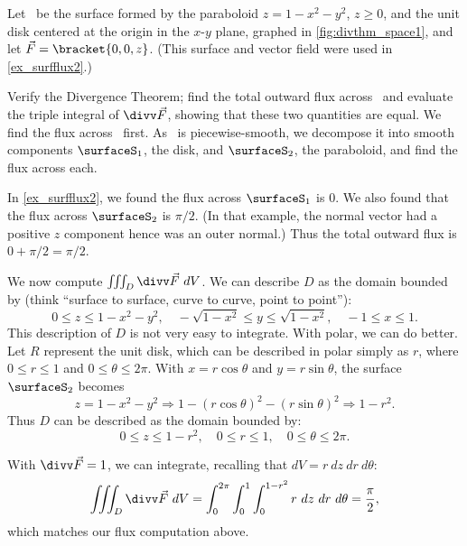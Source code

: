 \begin{example}\label{ex_divthm_space1}
Let \surfaceS\ be the surface formed by the paraboloid $z=1-x^2-y^2$, $z\geq 0$, and the unit disk centered at the origin in the $x$-$y$ plane, graphed in \autoref{fig:divthm_space1}, and let $\vec F =\bracket{0,0,z}$. (This surface and vector field were used in \autoref{ex_surfflux2}.)

Verify the Divergence Theorem; find the total outward flux across \surfaceS\ and evaluate the triple integral of $\divv \vec F$, showing that these two quantities are equal.
\solution
We find the flux across \surfaceS\ first. As \surfaceS\ is piecewise-smooth, we decompose it into smooth components $\surfaceS_1$, the disk, and $\surfaceS_2$, the paraboloid, and find the flux across each.

In \autoref{ex_surfflux2}, we found the flux across $\surfaceS_1$ is 0. We also found that the flux across $\surfaceS_2$ is $\pi/2$. (In that example, the normal vector had a positive $z$ component hence was an outer normal.) Thus the total outward flux is $0+\pi/2 = \pi/2$.

We now compute $\iiint_D \divv \vec F\ dV$. We can describe $D$ as the domain bounded by (think ``surface to surface, curve to curve, point to point''):
\[
0\leq z\leq 1-x^2-y^2,
\quad -\sqrt{1-x^2}\leq y\leq \sqrt{1-x^2},
\quad -1\leq x\leq 1.
\]
This description of $D$ is not very easy to integrate. With polar, we can do better. Let $R$ represent the unit disk, which can be described in polar simply as $r$, where $0\leq r\leq 1$ and $0\leq \theta\leq 2\pi$. With $x=r\cos \theta$ and $y=r\sin\theta$, the surface $\surfaceS_2$ becomes
\[z=1-x^2-y^2 \Rightarrow 1-(r\cos\theta)^2-(r\sin\theta)^2 \Rightarrow 1-r^2.\]
Thus $D$ can be described as the domain bounded by:
\[0\leq z\leq 1-r^2,\quad 0\leq r\leq 1,\quad 0\leq \theta\leq 2\pi.\]

With $\divv \vec F = 1$, we can integrate, recalling that $dV = r\ dz\ dr\ d\theta$:
\[
\iiint_D\divv \vec F\ dV
= \int_0^{2\pi}\int_0^1\int_0^{1-r^2} r\ dz\ dr\ d\theta = \frac{\pi}2,
\]
which matches our flux computation above.
\end{example}


